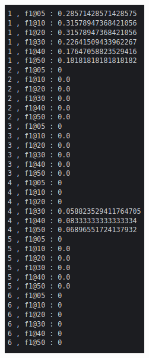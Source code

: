 \begin{figure}[H]
\begin{subfigure}{0.22\textwidth}
  \end{subfigure}
  \begin{subfigure}{0.22\textwidth}
  \includegraphics[width=\textwidth]{Sections/7Results/images/runexample3.png}\hfill

\end{subfigure}
\end{figure}
